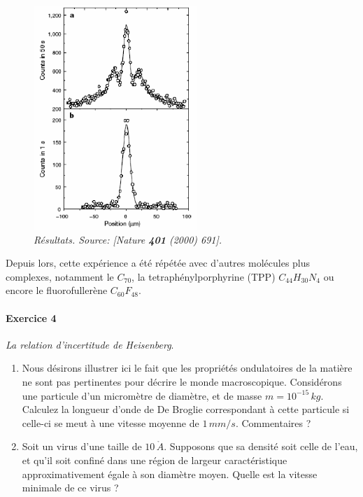 \begin{figure}[h!]
\begin{center}
\includegraphics[width=0.55\textwidth]{Pictures/Resultat.PNG}
\end{center}
\caption{\textit{Résultats. Source: [Nature \textbf{401} (2000) 691].}}
\end{figure}
\newpage
Depuis lors, cette expérience a été répétée avec d'autres molécules plus complexes, notamment le $C_{70}$, la tetraphénylporphyrine (TPP) $C_{44} H_{30} N_4$ ou encore le fluorofullerène $C_{60} F_{48}$.

\paragraph{Exercice 4} \textit{La relation d'incertitude de Heisenberg}.
\begin{enumerate}
\item Nous désirons illustrer ici le fait que les propriétés ondulatoires de la matière ne sont pas pertinentes pour décrire le monde macroscopique. Considérons une particule d'un micromètre de diamètre, et de masse $m = 10^{-15}\, kg$. Calculez la longueur d'onde de De Broglie correspondant à cette particule si celle-ci se meut à une vitesse moyenne de $1\, mm /s$. Commentaires ?
\item Soit un virus d'une taille de $10 \, \mathring{A}$. Supposons que sa densité soit celle de l'eau, et qu'il soit confiné dans une région de largeur caractéristique approximativement égale à son diamètre moyen. Quelle est la vitesse minimale de ce virus ?
\end{enumerate}